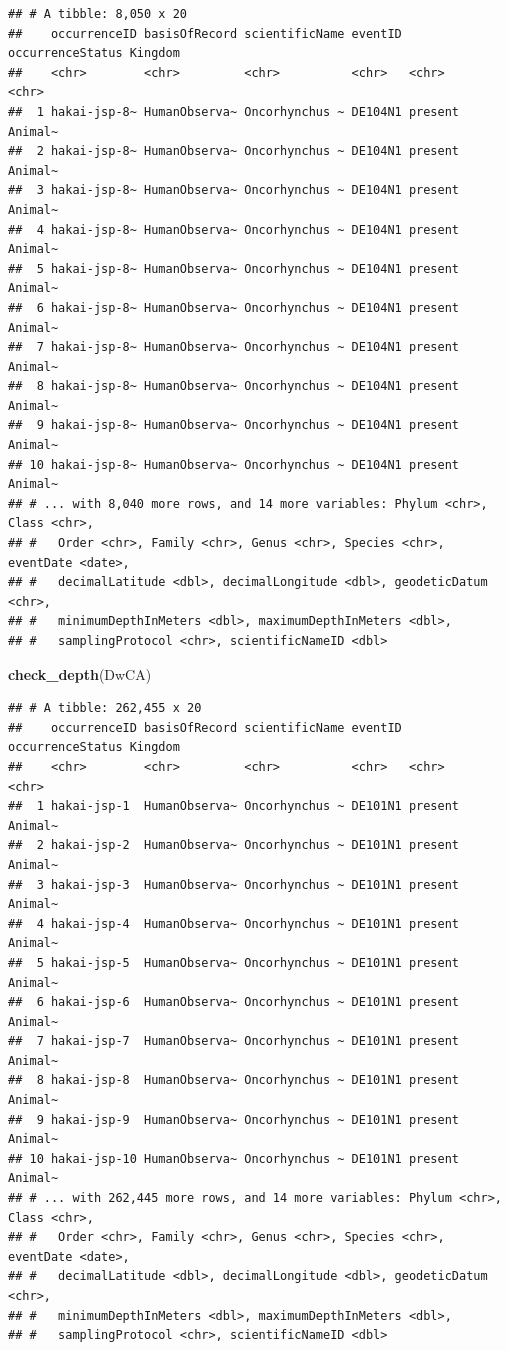 \documentclass[]{book}
\newenvironment{Shaded}{\begin{snugshade}}{\end{snugshade}}
\newcommand{\KeywordTok}[1]{\textcolor[rgb]{0.13,0.29,0.53}{\textbf{#1}}}
\newcommand{\NormalTok}[1]{#1}
\begin{document}
\begin{verbatim}
## # A tibble: 8,050 x 20
##    occurrenceID basisOfRecord scientificName eventID occurrenceStatus Kingdom
##    <chr>        <chr>         <chr>          <chr>   <chr>            <chr>  
##  1 hakai-jsp-8~ HumanObserva~ Oncorhynchus ~ DE104N1 present          Animal~
##  2 hakai-jsp-8~ HumanObserva~ Oncorhynchus ~ DE104N1 present          Animal~
##  3 hakai-jsp-8~ HumanObserva~ Oncorhynchus ~ DE104N1 present          Animal~
##  4 hakai-jsp-8~ HumanObserva~ Oncorhynchus ~ DE104N1 present          Animal~
##  5 hakai-jsp-8~ HumanObserva~ Oncorhynchus ~ DE104N1 present          Animal~
##  6 hakai-jsp-8~ HumanObserva~ Oncorhynchus ~ DE104N1 present          Animal~
##  7 hakai-jsp-8~ HumanObserva~ Oncorhynchus ~ DE104N1 present          Animal~
##  8 hakai-jsp-8~ HumanObserva~ Oncorhynchus ~ DE104N1 present          Animal~
##  9 hakai-jsp-8~ HumanObserva~ Oncorhynchus ~ DE104N1 present          Animal~
## 10 hakai-jsp-8~ HumanObserva~ Oncorhynchus ~ DE104N1 present          Animal~
## # ... with 8,040 more rows, and 14 more variables: Phylum <chr>, Class <chr>,
## #   Order <chr>, Family <chr>, Genus <chr>, Species <chr>, eventDate <date>,
## #   decimalLatitude <dbl>, decimalLongitude <dbl>, geodeticDatum <chr>,
## #   minimumDepthInMeters <dbl>, maximumDepthInMeters <dbl>,
## #   samplingProtocol <chr>, scientificNameID <dbl>
\end{verbatim}

\begin{Shaded}
\begin{Highlighting}[]
\KeywordTok{check_depth}\NormalTok{(DwCA)}
\end{Highlighting}
\end{Shaded}

\begin{verbatim}
## # A tibble: 262,455 x 20
##    occurrenceID basisOfRecord scientificName eventID occurrenceStatus Kingdom
##    <chr>        <chr>         <chr>          <chr>   <chr>            <chr>  
##  1 hakai-jsp-1  HumanObserva~ Oncorhynchus ~ DE101N1 present          Animal~
##  2 hakai-jsp-2  HumanObserva~ Oncorhynchus ~ DE101N1 present          Animal~
##  3 hakai-jsp-3  HumanObserva~ Oncorhynchus ~ DE101N1 present          Animal~
##  4 hakai-jsp-4  HumanObserva~ Oncorhynchus ~ DE101N1 present          Animal~
##  5 hakai-jsp-5  HumanObserva~ Oncorhynchus ~ DE101N1 present          Animal~
##  6 hakai-jsp-6  HumanObserva~ Oncorhynchus ~ DE101N1 present          Animal~
##  7 hakai-jsp-7  HumanObserva~ Oncorhynchus ~ DE101N1 present          Animal~
##  8 hakai-jsp-8  HumanObserva~ Oncorhynchus ~ DE101N1 present          Animal~
##  9 hakai-jsp-9  HumanObserva~ Oncorhynchus ~ DE101N1 present          Animal~
## 10 hakai-jsp-10 HumanObserva~ Oncorhynchus ~ DE101N1 present          Animal~
## # ... with 262,445 more rows, and 14 more variables: Phylum <chr>, Class <chr>,
## #   Order <chr>, Family <chr>, Genus <chr>, Species <chr>, eventDate <date>,
## #   decimalLatitude <dbl>, decimalLongitude <dbl>, geodeticDatum <chr>,
## #   minimumDepthInMeters <dbl>, maximumDepthInMeters <dbl>,
## #   samplingProtocol <chr>, scientificNameID <dbl>
\end{verbatim}
\end{document}
